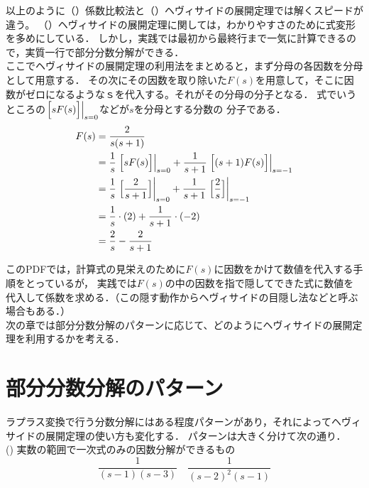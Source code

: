\documentclass[a4paper,12pt]{report}
\begin{document}
\vspace{2mm}
  \newpage
  以上のように（）係数比較法と（）ヘヴィサイドの展開定理では解くスピードが違う。
  （）ヘヴィサイドの展開定理に関しては，わかりやすさのために式変形を多めにしている．
  しかし，実践では最初から最終行まで一気に計算できるので，実質一行で部分分数分解ができる．\\
  
  ここでヘヴィサイドの展開定理の利用法をまとめると，まず分母の各因数を分母として用意する．
  その次にその因数を取り除いた\(F(s)\)を用意して，そこに因数がゼロになるようなｓを代入する。それがその分母の分子となる．
  式でいうところの\(\left.\Bigl[sF(s)\Bigr]\right|_{s=0} \)などが\(s\)を分母とする分数の
  分子である．
  \begin{align*}
    F(s) &= \frac{2}{s(s+1)} \\
        &= \frac{1}{s}\left.\Bigl[sF(s)\Bigr]\right|_{s=0} 
            + \frac{1}{s+1}\left.\Bigl[(s+1)F(s)\Bigr]\right|_{s=-1}\\
        &= \frac{1}{s}\left.\Bigl[\frac{2}{s+1}\Bigr]\right|_{s=0} 
            + \frac{1}{s+1}\left.\Bigl[\frac{2}{s}\Bigr]\right|_{s=-1}\\
        &= \frac{1}{s}\cdot(2) 
            + \frac{1}{s+1}\cdot(-2)\\
        &= \frac{2}{s}
            - \frac{2}{s+1}\\
  \end{align*}
  
  このPDFでは，計算式の見栄えのために\(F(s)\)に因数をかけて数値を代入する手順をとっているが，
  実践では\(F(s)\)の中の因数を指で隠してできた式に数値を代入して係数を求める．（この隠す動作からヘヴィサイドの目隠し法などと呼ぶ場合もある．）\\

  次の章では部分分数分解のパターンに応じて、どのようにヘヴィサイドの展開定理を利用するかを考える．

  \chapter{部分分数分解のパターン}

  ラプラス変換で行う分数分解にはある程度パターンがあり，それによってヘヴィサイドの展開定理の使い方も変化する．
  パターンは大きく分けて次の通り．\\


  \quad (\MakeUppercase{}) 実数の範囲で一次式のみの因数分解ができるもの 
    \[
    \frac{1}{\left(s-1\right) \left(s-3\right)} \quad \frac{1}{\left(s-2\right)^2 \left(s-1\right)}
    \]
\end{document}
